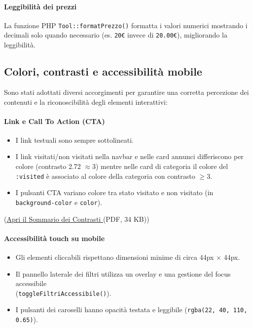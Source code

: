 \documentclass[a4paper,12pt]{article}
\begin{document}
\paragraph{Leggibilità dei prezzi}
La funzione PHP \texttt{Tool::formatPrezzo()} formatta i valori numerici mostrando i decimali solo quando necessario (es. \texttt{20€} invece di \texttt{20.00€}), migliorando la leggibilità.

\subsection{Colori, contrasti e accessibilità mobile}

Sono stati adottati diversi accorgimenti per garantire una corretta percezione dei contenuti e la riconoscibilità degli elementi interattivi:

\paragraph{Link e Call To Action (CTA)}
    \begin{itemize}
        \item I link testuali sono sempre sottolineati.
        \item I link visitati/non visitati nella navbar e nelle card annunci differiscono per colore (contrasto 2.72 $\approx 3$) mentre nelle card di categoria il colore del \texttt{:visited} è associato al colore della categoria con contrasto $\geq 3$.
        \item I pulsanti CTA variano colore tra stato visitato e non visitato (in \texttt{background-color} e \texttt{color}).
    \end{itemize}
    (\href{https://caa.studenti.math.unipd.it/sdeblasi/relazione/sommario-contrasti.pdf}{\underline{Apri il Sommario dei Contrasti} }(PDF, 34 KB))


\paragraph{Accessibilità touch su mobile}
    \begin{itemize}
        \item Gli elementi cliccabili rispettano dimensioni minime di circa 44px × 44px.
        \item Il pannello laterale dei filtri utilizza un overlay e una gestione del focus accessibile \\(\texttt{toggleFiltriAccessibile()}).
        \item I pulsanti dei caroselli hanno opacità testata e leggibile (\texttt{rgba(22, 40, 110, 0.65)}).
    \end{itemize}
\end{document}
